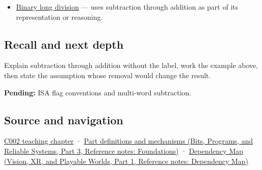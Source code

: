 \hypertarget{appendix-1c7df340573e-used-by}{}

\begin{itemize}
\tightlist
\item
  \hyperref[appendix-89985e6a2685]{Binary long division} --- uses subtraction through addition as part of its representation or reasoning.
\end{itemize}

\subsection{Recall and next depth}\label{appendix-1c7df340573e-recall-and-next-depth}

\hypertarget{appendix-1c7df340573e-recall-and-next-depth}{}

Explain subtraction through addition without the label, work the example above, then state the assumption whose removal would change the result.

\textbf{Pending:} ISA flag conventions and multi-word subtraction.

\subsection{Source and navigation}\label{appendix-1c7df340573e-source-and-navigation}

\hypertarget{appendix-1c7df340573e-source-and-navigation}{}

\hyperref[01-foundations-i-ch001-arithmetic-becomes-a-policy]{C002 teaching chapter} · \href{../01-Bits-Programs-and-Reliable-Systems-P03/main.pdf\#appendix-fd090d982a15}{Part definitions and mechanisms (Bits, Programs, and Reliable Systems, Part 3, Reference notes: Foundations)} · \href{../07-Vision-XR-and-Playable-Worlds-P01/main.pdf\#appendix-4ad47bdd269a}{Dependency Map (Vision, XR, and Playable Worlds, Part 1, Reference notes: Dependency Map)}
